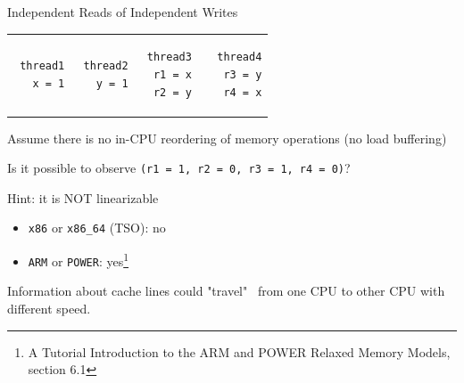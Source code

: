 \begin{frame}{Independent Reads of Independent Writes}
 
 \begin{tabular}{p{} p{} p{} p{}}
 \begin{verbatim}
 thread1
   x = 1
 \end{verbatim}
 
 & 
 
 \begin{verbatim}
 thread2
   y = 1
 \end{verbatim}
 
 &
 
 \begin{verbatim}
 thread3
  r1 = x
  r2 = y 
 \end{verbatim}
 
 &
 
 \begin{verbatim}
 thread4
  r3 = y
  r4 = x
 \end{verbatim}
 \end{tabular}
 
 Assume there is no in-CPU reordering of memory operations (no load buffering)

 Is it possible to observe \texttt{(r1 = 1, r2 = 0, r3 = 1, r4 = 0)}?

 Hint: it is NOT linearizable
 
 \pause
 \begin{itemize}
 \item \texttt{x86} or \texttt{x86\_64} (TSO): no
 
 \pause
 \item \texttt{ARM} or \texttt{POWER}: yes\footnote<3->{\tiny A Tutorial Introduction to the ARM and POWER Relaxed Memory Models, section 6.1}
 \end{itemize}
 
 \pause
 Information about cache lines could "travel" \ from one CPU to other CPU with different speed.

 \end{frame}


